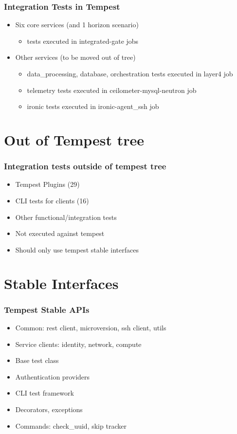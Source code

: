 \documentclass[aspectratio=169,11pt,hyperref={colorlinks=true}]{beamer}
\begin{document}
\begin{frame}
    \frametitle{Integration Tests in Tempest}
    \begin{itemize}
        \item{Six core services (and 1 horizon scenario)}
            \begin{itemize}
                \item{tests executed in integrated-gate jobs}
            \end{itemize}
        \item{Other services (to be moved out of tree)}
            \begin{itemize}
                \item{data\_processing, database, orchestration tests executed in layer4 job}
                \item{telemetry tests executed in ceilometer-mysql-neutron job}
                \item{ironic tests executed in ironic-agent\_ssh job}
            \end{itemize}
    \end{itemize}
\end{frame}

\section{Out of Tempest tree}
\begin{frame}
    \frametitle{Integration tests outside of tempest tree}
    \begin{itemize}
        \item{Tempest Plugins (29)}
        \item{CLI tests for clients (16)}
        \item{Other functional/integration tests}
    \end{itemize}
    \begin{itemize}
        \item{Not executed against tempest}
        \item{Should only use tempest stable interfaces}
    \end{itemize}
\end{frame}

\section{Stable Interfaces}
\begin{frame}
    \frametitle{Tempest Stable APIs}
    \begin{itemize}
        \item{Common: rest client, microversion, ssh client, utils}
        \item{Service clients: identity, network, compute}
        \item{Base test class}
        \item{Authentication providers}
        \item{CLI test framework}
        \item{Decorators, exceptions}
        \item{Commands: check\_uuid, skip tracker}
    \end{itemize}
\end{frame}
\end{document}
